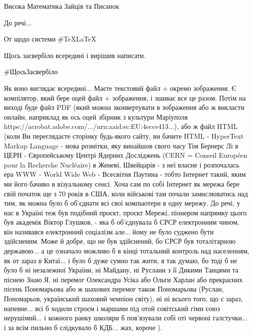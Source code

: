  
 
 
 
 

Висока Математика Зайців та Писанок

До речі...

От щодо системи #TeXLaTeX

Щось засвербіло всередині і вирішив написати.

#ЩосьЗасвербіло

Як воно виглядає всередині... Маєте текстовий файл + окремо зображення. Є
компілятор, який бере оцей файл + зображення, і зшиває все це разом. Потім на
виході буде файл PDF (який можна зконвертувати в зображення або ж викласти
онлайн, наприклад як ось оцей збірник з культури Маріуполя
https://acrobat.adobe.com/.../urn:aaid:sc:EU:4ecce413...), або ж файл HTML
(коли Ви переглядаєте сторінку будь-якого сайту, ви бачите HTML - HyperText
Markup Language - мова розмітки, яку винайшов свого часу Тім Бернерс Лі в ЦЕРН
- Європейському Центрі Ядерних Досліджень (CERN = Conseil Européen pour la
Recherche Nucléaire) в Женеві, Швейцарія - з неї власне і розпочалась ера WWW -
World Wide Web - Всесвітня Паутина - тобто Інтернет такий, яким ми його бачиво
в візуальному сенсі. Хоча сам по собі Інтернет як мережа бере свій початок ще з
70 років в США, коли військові там почали замислюватись над тим, як можна було
б об'єднати всі свої компьютери в одну мережу. До речі, у нас в Україні теж був
подібний проєкт, проєкт Мережі, піонером напрямку цього був академік Віктор
Глушков, - яка б об'єднувала б СРСР електронним чином, він називався
електронний соціалізм але... йому не було суджено бути здійсненим. Може й
добре, що не був здійснений, бо СРСР був тоталітарною державою... а це означало
можливо б в кінці тотальний контроль над населенням, як от зараз в Китаї... і
було б дуже сумно так жити, я так думаю, бо тоді б не було б ні незалежної
України, ні Майдану, ні Руслани з її Дикими Танцями та піснею Знаю Я, ні
перемог Олександра Усіка або Ольги Харлан або прекрасних пісень Пономарьова або
ж шахових перемог також Пономарьова (Руслан, Пономарьов, український шаховий
чемпіон світу), ні ні всього того, що є зараз, напевне... всі б ходили строєм і
маршами під отой совітський гімн союз нерушімий... і кожного ранку школяри б
пов'язували собі оті червоні галстучки... і за всім пильно б слідкувало б
КДБ... жах, короче  ). 

